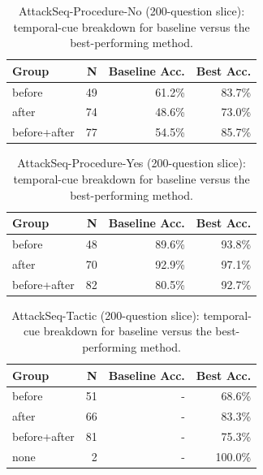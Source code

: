 \begin{table}[h]
\centering
\begin{tabular}{lrrr}
\toprule
Group & N & Baseline Acc. & Best Acc. \\
\midrule
before & 49 & 61.2\% & 83.7\% \\ 
after & 74 & 48.6\% & 73.0\% \\ 
before+after & 77 & 54.5\% & 85.7\% \\ 
\bottomrule
\end{tabular}
\caption{AttackSeq-Procedure-No (200-question slice): temporal-cue breakdown for baseline versus the best-performing method.}
\label{tab:attackseq_procedure_no_temporal_200}
\end{table}

\begin{table}[h]
\centering
\begin{tabular}{lrrr}
\toprule
Group & N & Baseline Acc. & Best Acc. \\
\midrule
before & 48 & 89.6\% & 93.8\% \\ 
after & 70 & 92.9\% & 97.1\% \\ 
before+after & 82 & 80.5\% & 92.7\% \\ 
\bottomrule
\end{tabular}
\caption{AttackSeq-Procedure-Yes (200-question slice): temporal-cue breakdown for baseline versus the best-performing method.}
\label{tab:attackseq_procedure_yes_temporal_200}
\end{table}

\begin{table}[h]
\centering
\begin{tabular}{lrrr}
\toprule
Group & N & Baseline Acc. & Best Acc. \\
\midrule
before & 51 & - & 68.6\% \\ 
after & 66 & - & 83.3\% \\ 
before+after & 81 & - & 75.3\% \\ 
none & 2 & - & 100.0\% \\ 
\bottomrule
\end{tabular}
\caption{AttackSeq-Tactic (200-question slice): temporal-cue breakdown for baseline versus the best-performing method.}
\label{tab:attackseq_tactic_temporal_200}
\end{table}

